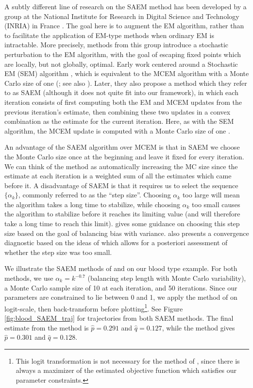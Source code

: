 \documentclass[ss]{imsart}
\theoremstyle{plain}
\theoremstyle{definition}
\theoremstyle{remark}
\begin{document}
A subtly different line of research on the SAEM method has been developed by a group at the National Institute for Research in Digital Science and Technology (INRIA) in France \citep[see, e.g.,][for a review of some of their methods]{Cel95}. The goal here is to augment the EM algorithm, rather than to facilitate the application of EM-type methods when ordinary EM is intractable. More precisely, methods from this group introduce a stochastic perturbation to the EM algorithm, with the goal of escaping fixed points which are locally, but not globally, optimal. Early work centered around a Stochastic EM (SEM) algorithm \citep{Cel85}, which is equivalent to the MCEM algorithm with a Monte Carlo size of one (\citealp{Cel87,Cel95}; see also \citealp{Nie00II}). Later, they also propose a method which they refer to as SAEM (although it does not quite fit into our framework), in which each iteration consists of first computing both the EM and MCEM updates from the previous iteration's estimate, then combining these two updates in a convex combination as the estimate for the current iteration. Here, as with the SEM algorithm, the MCEM update is computed with a Monte Carlo size of one \citep{Cel92, Cel95}.

An advantage of the SAEM algorithm over MCEM is that in SAEM we choose the Monte Carlo size once at the beginning and leave it fixed for every iteration. We can think of the method as automatically increasing the MC size since the estimate at each iteration is a weighted sum of all the estimates which came before it. A disadvantage of SAEM is that it requires us to select the sequence $\{ \alpha_k \}$, commonly referred to as the ``step size''. Choosing $\alpha_k$ too large will mean the algorithm takes a long time to stabilize, while choosing $\alpha_k$ too small causes the algorithm to stabilize before it reaches its limiting value (and will therefore take a long time to reach this limit). \citet{Jan06} gives some guidance on choosing this step size based on the goal of balancing bias with variance. \citeauthor{Jan06} also presents a convergence diagnostic based on the ideas of \citet{Caf05} which allows for a posteriori assessment of whether the step size was too small. 

We illustrate the SAEM methods of \citet{Gu98I} and \citet{Del99} on our blood type example. For both methods, we use $\alpha_k = k^{-0.7}$ (balancing step length with Monte Carlo variability), a Monte Carlo sample size of 10 at each iteration, and 50 iterations. Since our parameters are constrained to lie between 0 and 1, we apply the method of \citeauthor{Gu98I} on logit-scale, then back-transform before plotting\footnote{This logit transformation is not necessary for the method of \citet{Del99}, since there is always a maximizer of the estimated objective function which satisfies our parameter constraints.}. See Figure \ref{fig:blood_SAEM_traj} for trajectories from both SAEM methods. The final estimate from the \citeauthor{Gu98I} method is $\hat{p} = 0.291$ and $\hat{q} = 0.127$, while the \citeauthor{Del99} method gives $\hat{p} = 0.301$ and $\hat{q} = 0.128$. 
\end{document}
